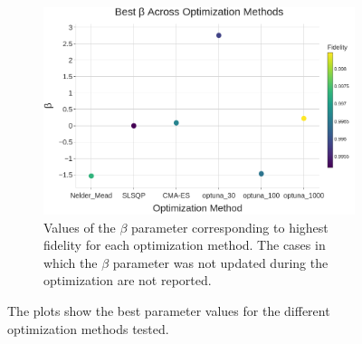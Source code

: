 \begin{figure}[h!]
\begin{subfigure}[t]{0.3\textwidth}
        \includegraphics[width=\textwidth]{figures/png/RB_optimization/BestBeta.png}
        \caption{Values of the $\beta$ parameter corresponding to highest fidelity for each optimization method.
        The cases in which the $\beta$ parameter was not updated during the optimization are not reported.}
        \label{fig:beta_best}
    \end{subfigure}
    \caption{The plots show the best parameter values for the different optimization methods tested.} 
    \label{fig:params_best}
\end{figure}

